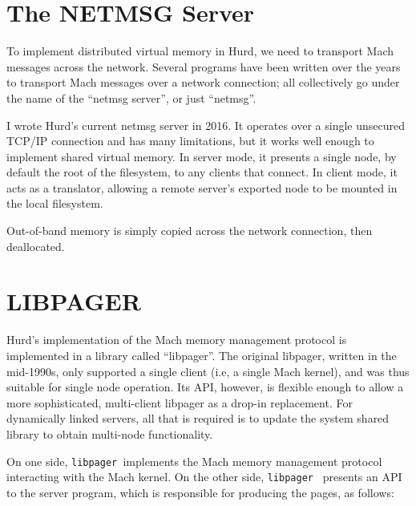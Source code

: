 \documentclass{article}
\def\libpager{{\tt libpager\ }}
\begin{document}
\section{The NETMSG Server}

To implement distributed virtual memory in Hurd, we need to transport
Mach messages across the network.  Several programs have been written
over the years to transport Mach messages over a network connection;
all collectively go under the name of the ``netmsg server'', or just
``netmsg''.

I wrote Hurd's current netmsg server in 2016.  It operates over a
single unsecured TCP/IP connection and has many limitations, but it
works well enough to implement shared virtual memory.  In server mode,
it presents a single node, by default the root of the filesystem, to
any clients that connect.  In client mode, it acts as a translator,
allowing a remote server's exported node to be mounted in the
local filesystem.

Out-of-band memory is simply
copied across the network connection, then deallocated.


\section{LIBPAGER}

Hurd's implementation of the Mach memory management protocol is
implemented in a library called ``libpager''.  The original libpager,
written in the mid-1990s, only supported a single client (i.e, a
single Mach kernel), and was thus suitable for single node operation.
Its API, however, is flexible enough to allow a more sophisticated,
multi-client libpager as a drop-in replacement.  For dynamically
linked servers, all that is required is to update the system shared
library to obtain multi-node functionality.

On one side, \libpager implements the Mach memory management protocol
interacting with the Mach kernel.  On the other side, \libpager
presents an API to the server program, which is responsible for
producing the pages, as follows:
\end{document}
